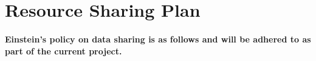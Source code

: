 
\section{Resource Sharing Plan}
\lipsum[1-4]
\paragraph{Einstein’s policy on data sharing is as follows and will be adhered to as part of the current project.} \lipsum[5-5]